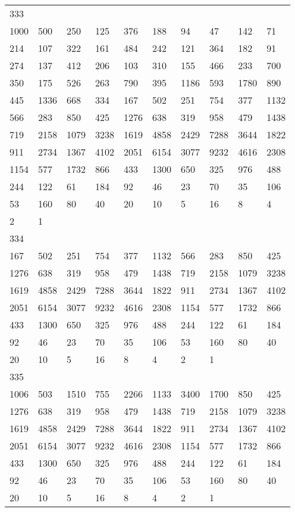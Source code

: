 \begin{longtable}{*{10}{l}}
333&&&&&&&&&\\
1000& 500& 250& 125& 376& 188& 94& 47& 142& 71\\
214& 107& 322& 161& 484& 242& 121& 364& 182& 91\\
274& 137& 412& 206& 103& 310& 155& 466& 233& 700\\
350& 175& 526& 263& 790& 395& 1186& 593& 1780& 890\\
445& 1336& 668& 334& 167& 502& 251& 754& 377& 1132\\
566& 283& 850& 425& 1276& 638& 319& 958& 479& 1438\\
719& 2158& 1079& 3238& 1619& 4858& 2429& 7288& 3644& 1822\\
911& 2734& 1367& 4102& 2051& 6154& 3077& 9232& 4616& 2308\\
1154& 577& 1732& 866& 433& 1300& 650& 325& 976& 488\\
244& 122& 61& 184& 92& 46& 23& 70& 35& 106\\
53& 160& 80& 40& 20& 10& 5& 16& 8& 4\\
2& 1& \\

334&&&&&&&&&\\
167& 502& 251& 754& 377& 1132& 566& 283& 850& 425\\
1276& 638& 319& 958& 479& 1438& 719& 2158& 1079& 3238\\
1619& 4858& 2429& 7288& 3644& 1822& 911& 2734& 1367& 4102\\
2051& 6154& 3077& 9232& 4616& 2308& 1154& 577& 1732& 866\\
433& 1300& 650& 325& 976& 488& 244& 122& 61& 184\\
92& 46& 23& 70& 35& 106& 53& 160& 80& 40\\
20& 10& 5& 16& 8& 4& 2& 1& \\

335&&&&&&&&&\\
1006& 503& 1510& 755& 2266& 1133& 3400& 1700& 850& 425\\
1276& 638& 319& 958& 479& 1438& 719& 2158& 1079& 3238\\
1619& 4858& 2429& 7288& 3644& 1822& 911& 2734& 1367& 4102\\
2051& 6154& 3077& 9232& 4616& 2308& 1154& 577& 1732& 866\\
433& 1300& 650& 325& 976& 488& 244& 122& 61& 184\\
92& 46& 23& 70& 35& 106& 53& 160& 80& 40\\
20& 10& 5& 16& 8& 4& 2& 1& \\


\end{longtable}

